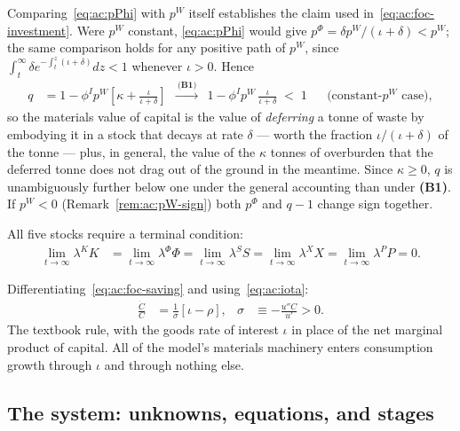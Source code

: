 Comparing~\eqref{eq:ac:pPhi} with $p^W$ itself establishes the claim used in~\eqref{eq:ac:foc-investment}. Were $p^W$ constant, \eqref{eq:ac:pPhi} would give $p^\Phi=\delta p^W/\left(\iota+\delta\right)<p^W$; the same comparison holds for any positive path of $p^W$, since $\int_t^\infty\delta e^{-\int_t^z(\iota+\delta)}dz<1$ whenever $\iota>0$. Hence
\begin{align}
q &= 1-\phi^Ip^W\left[\kappa+\frac{\iota}{\iota+\delta}\right]
\ \ \xrightarrow{\ \textbf{(B1)}\ }\ \
1-\phi^Ip^W\,\frac{\iota}{\iota+\delta}\;<\;1
&&\text{(constant-}p^W\text{ case)},
\label{eq:ac:q-explicit}
\end{align}
so the materials value of capital is the value of \emph{deferring} a tonne of waste by embodying it in a stock that decays at rate $\delta$ --- worth the fraction $\iota/(\iota+\delta)$ of the tonne --- plus, in general, the value of the $\kappa$ tonnes of overburden that the deferred tonne does not drag out of the ground in the meantime. Since $\kappa\ge0$, $q$ is unambiguously further below one under the general accounting than under \textbf{(B1)}. If $p^W<0$ (Remark~\ref{rem:ac:pW-sign}) both $p^\Phi$ and $q-1$ change sign together.

 All five stocks require a terminal condition:
\begin{align}
\lim_{t\to\infty}\lambda^KK &= \lim_{t\to\infty}\lambda^\Phi\Phi = \lim_{t\to\infty}\lambda^SS = \lim_{t\to\infty}\lambda^XX = \lim_{t\to\infty}\lambda^PP = 0.
\label{eq:ac:transversality}
\end{align}

 Differentiating~\eqref{eq:ac:foc-saving} and using~\eqref{eq:ac:iota}:
\begin{align}
\frac{\dot C}{C} &= \frac{1}{\sigma}\left[\iota-\rho\right],
&
\sigma&\equiv-\frac{u''C}{u'}>0.
\label{eq:ac:keynes-ramsey}
\end{align}
The textbook rule, with the goods rate of interest $\iota$ in place of the net marginal product of capital. All of the model's materials machinery enters consumption growth through $\iota$ and through nothing else.

\subsection{The system: unknowns, equations, and stages}
\label{subsec:ac:system}

